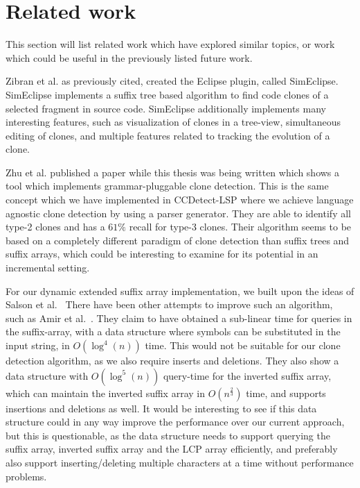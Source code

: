 \section{Related work}

This section will list related work which have explored similar topics, or work which
could be useful in the previously listed future work.

Zibran et al. as previously cited, created the Eclipse plugin, called
SimEclipse\cite{Udding_Towards_Convenient_Management}. SimEclipse implements a suffix tree
based algorithm to find code clones of a selected fragment in source
code\cite{Zibran_real_time_search}. SimEclipse additionally implements many interesting
features, such as visualization of clones in a tree-view, simultaneous editing of clones,
and multiple features related to tracking the evolution of a clone.

Zhu et al. published a paper while this thesis was being written which shows a tool which
implements grammar-pluggable clone detection. This is the same concept which we have
implemented in CCDetect-LSP where we achieve language agnostic clone detection by using a
parser generator. They are able to identify all type-2 clones and has a $61\%$ recall for
type-3 clones. Their algorithm seems to be based on a completely different paradigm of
clone detection than suffix trees and suffix arrays, which could be interesting to examine
for its potential in an incremental setting.

For our dynamic extended suffix array implementation, we built upon the ideas of Salson et
al.~\cite{DynamicExtendedSuffixArrays, DynamicExtendedSuffixArraysReorderings, DynamicBWT}
There have been other attempts to improve such an algorithm, such as Amir et
al.~\cite{AmirDynamicSuffixWithPoly}. They claim to have obtained a sub-linear time for
queries in the suffix-array, with a data structure where symbols can be substituted in the
input string, in $O(\log^4(n))$ time. This would not be suitable for our clone detection
algorithm, as we also require inserts and deletions. They also show a data structure with
$O(\log^5(n))$ query-time for the inverted suffix array, which can maintain the inverted
suffix array in $O(n^{\frac{2}{3}})$ time, and supports insertions and deletions as well.
It would be interesting to see if this data structure could in any way improve the
performance over our current approach, but this is questionable, as the data structure
needs to support querying the suffix array, inverted suffix array and the LCP array
efficiently, and preferably also support inserting/deleting multiple characters at a time
without performance problems.
